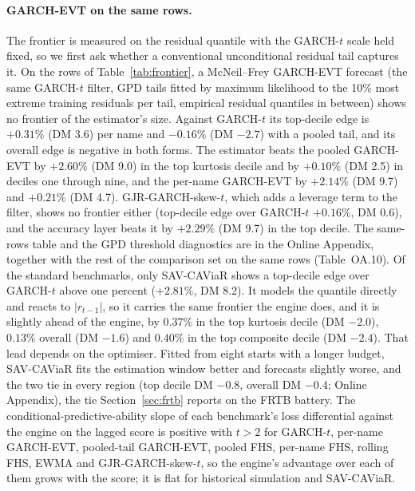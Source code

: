 \documentclass[11pt]{article}
\theoremstyle{remark}
\begin{document}
\paragraph{GARCH-EVT on the same rows.} The frontier is measured on the residual quantile with the GARCH-$t$ scale held fixed, so we first ask whether a conventional unconditional residual tail captures it. On the rows of Table~\ref{tab:frontier}, a McNeil--Frey GARCH-EVT forecast (the same GARCH-$t$ filter, GPD tails fitted by maximum likelihood to the 10\% most extreme training residuals per tail, empirical residual quantiles in between) shows no frontier of the estimator's size. Against GARCH-$t$ its top-decile edge is $+0.31\%$ (DM 3.6) per name and $-0.16\%$ (DM $-2.7$) with a pooled tail, and its overall edge is negative in both forms. The estimator beats the pooled GARCH-EVT by $+2.60\%$ (DM 9.0) in the top kurtosis decile and by $+0.10\%$ (DM 2.5) in deciles one through nine, and the per-name GARCH-EVT by $+2.14\%$ (DM 9.7) and $+0.21\%$ (DM 4.7). GJR-GARCH-skew-$t$, which adds a leverage term to the filter, shows no frontier either (top-decile edge over GARCH-$t$ $+0.16\%$, DM 0.6), and the accuracy layer beats it by $+2.29\%$ (DM 9.7) in the top decile. The same-rows table and the GPD threshold diagnostics are in the Online Appendix, together with the rest of the comparison set on the same rows (Table~OA.10). Of the standard benchmarks, only SAV-CAViaR shows a top-decile edge over GARCH-$t$ above one percent ($+2.81\%$, DM 8.2). It models the quantile directly and reacts to $|r_{t-1}|$, so it carries the same frontier the engine does, and it is slightly ahead of the engine, by $0.37\%$ in the top kurtosis decile (DM $-2.0$), $0.13\%$ overall (DM $-1.6$) and $0.40\%$ in the top composite decile (DM $-2.4$). That lead depends on the optimiser. Fitted from eight starts with a longer budget, SAV-CAViaR fits the estimation window better and forecasts slightly worse, and the two tie in every region (top decile DM $-0.8$, overall DM $-0.4$; Online Appendix), the tie Section~\ref{sec:frtb} reports on the FRTB battery. The conditional-predictive-ability slope of each benchmark's loss differential against the engine on the lagged score is positive with $t>2$ for GARCH-$t$, per-name GARCH-EVT, pooled-tail GARCH-EVT, pooled FHS, per-name FHS, rolling FHS, EWMA and GJR-GARCH-skew-$t$, so the engine's advantage over each of them grows with the score; it is flat for historical simulation and SAV-CAViaR.
\end{document}
